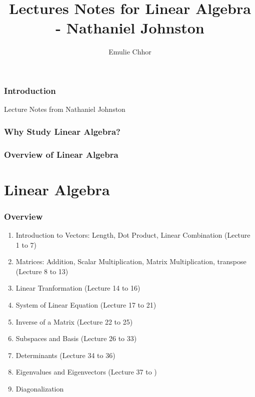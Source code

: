 \documentclass{article}
\begin{document}
\title{Lectures Notes for Linear Algebra - Nathaniel Johnston}
\author{Emulie Chhor}
\maketitle

\section*{Introduction}

Lecture Notes from Nathaniel Johnston

\section*{Why Study Linear Algebra?}

\section{Overview of Linear Algebra}

\pagebreak

\newtheorem{definition}{Definition}[subsection]
\newtheorem{theorem}{Theorem}[subsection]
\newtheorem{corollary}{Corollary}[subsection]
\newtheorem{lemma}[theorem]{Lemma}
\newtheorem{proposition}{Proposition}[section]
\newtheorem{axiom}{Axiome}
\newtheorem{property}{Propriété}[subsection]
\newtheorem*{remark}{Remarque}
\newtheorem*{problem}{Problème}
\newtheorem*{intuition}{Intuition}

\part{Linear Algebra}
\section{Overview}

\begin{enumerate}
    \item Introduction to Vectors: Length, Dot Product, Linear Combination
	(Lecture 1 to 7)
    \item Matrices: Addition, Scalar Multiplication, Matrix Multiplication,
	transpose (Lecture 8 to 13)
    \item Linear Tranformation (Lecture 14 to 16)
    \item System of Linear Equation (Lecture 17 to 21)
    \item Inverse of a Matrix (Lecture 22 to 25)
    \item Subspaces and Basis (Lecture 26 to 33)
    \item Determinants (Lecture 34 to 36)
    \item Eigenvalues and Eigenvectors (Lecture 37 to )
    \item Diagonalization
\end{enumerate}
\end{document}
